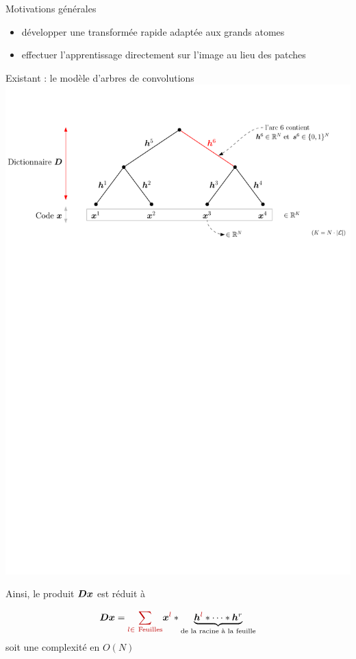 \begin{frame}{Motivations générales}
	\begin{itemize}
		\item développer une \alert{transformée rapide} adaptée aux grands atomes
		\item effectuer l'apprentissage \alert{directement sur l'image} au lieu des patches
	\end{itemize}
\end{frame}



\begin{frame}{Existant : le modèle d'arbres de convolutions}
\includegraphics[width=\textwidth]{figures/tree.pdf}

Ainsi, le produit $\bm{D}\bm{x}$ est réduit à

\begin{equation}
\D \x = \Req{\sum_{l \in ~\text{Feuilles}}} \x^{\Req{l}} * \underbrace{\h^{\Req{l}}* \dots* \h^{r}}_{\textrm{de la racine à la feuille}}
\end{equation}
soit une complexité en \alert{$O(N)$}

\end{frame}
 

